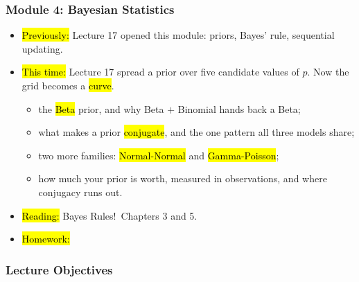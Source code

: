 

\begin{frame}
\frametitle{Module 4: Bayesian Statistics}
    \begin{itemize}
        \item \hl{Previously:} Lecture 17 opened this module: priors, Bayes' rule, sequential updating.
        \item \hl{This time:} Lecture 17 spread a prior over five candidate values of $p$. Now the grid becomes a \hl{curve}.
          \begin{itemize}
              \item the \hl{Beta} prior, and why Beta $+$ Binomial hands back a Beta;
              \item what makes a prior \hl{conjugate}, and the one pattern all three models share;
              \item two more families: \hl{Normal-Normal} and \hl{Gamma-Poisson};
              \item how much your prior is worth, measured in observations, and where conjugacy runs out.
          \end{itemize}
        \item \hl{Reading:} Bayes Rules!\ Chapters 3 and 5.
        \item \hl{Homework:}
    \end{itemize}
\end{frame}


\begin{frame}
    \frametitle{Lecture Objectives}
\end{frame}


